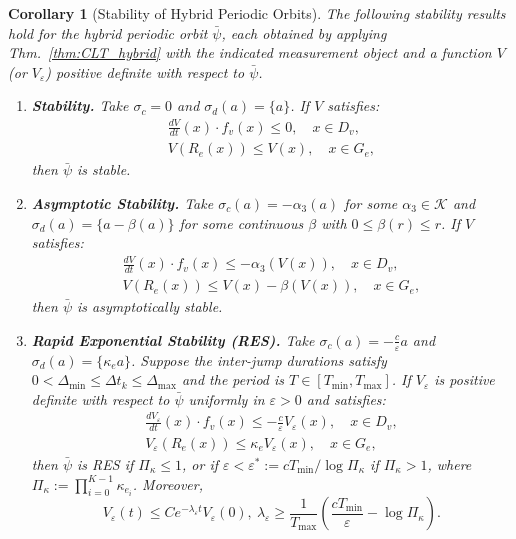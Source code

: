 \documentclass[letterpaper, 10 pt, conference]{IEEEconf}
\newtheorem{cor}[thm]{Corollary}
\theoremstyle{definition}
\begin{document}
\begin{cor}[Stability of Hybrid Periodic Orbits]
\label{cor:orbitstability}
    The following stability results hold for the hybrid periodic orbit $\bar\psi$, each obtained by applying Thm.~\ref{thm:CLT_hybrid} with the indicated measurement object and a function $V$ (or $V_\varepsilon$) positive definite with respect to $\bar\psi$.
    \begin{enumerate}
        \item \textbf{Stability.} Take $\sigma_c = 0$ and $\sigma_d(a) = \{a\}$. If $V$ satisfies:
        \begin{align}
            \frac{dV}{dt}(x) \cdot f_v(x) \leq 0, \quad x \in D_v, \label{eq:stab_flow} \\
            V(R_e(x)) \leq V(x), \quad x \in G_e, \label{eq:stab_jump}
        \end{align}
        then $\bar\psi$ is stable.
        \item \textbf{Asymptotic Stability.} Take $\sigma_c(a) = -\alpha_3(a)$ for some $\alpha_3 \in \mathcal{K}$ and $\sigma_d(a) = \{a-\beta(a)\}$ for some continuous $\beta$ with $0 \leq \beta(r) \leq r$. If $V$ satisfies:
        \begin{align}
            \frac{dV}{dt}(x) \cdot f_v(x) \leq -\alpha_3(V(x)), \quad x \in D_v, \label{eq:asym_flow} \\
            V(R_e(x)) \leq V(x) - \beta(V(x)), \quad x \in G_e, \label{eq:asym_jump}
        \end{align}
        then $\bar\psi$ is asymptotically stable.
        \item \textbf{Rapid Exponential Stability (RES).} Take $\sigma_c(a) = -\frac{c}{\varepsilon}a$ and $\sigma_d(a) = \{\kappa_e a\}$. Suppose the inter-jump durations satisfy $0 < \Delta_{\min} \leq \Delta t_k \leq \Delta_{\max}$ and the period is $T \in [T_{\min}, T_{\max}]$. If $V_\varepsilon$ is positive definite with respect to $\bar\psi$ uniformly in $\varepsilon > 0$ and satisfies:
        \begin{align}
            \frac{dV_\varepsilon}{dt}(x) \cdot f_v(x) \leq -\frac{c}{\varepsilon} V_\varepsilon(x), \quad x \in D_v, \label{eq:RES_flow} \\
            V_\varepsilon(R_e(x)) \leq \kappa_e V_\varepsilon(x), \quad x \in G_e, \label{eq:RES_jump}
        \end{align}
        then $\bar\psi$ is RES if $\Pi_\kappa \leq 1$, or if $\varepsilon < \varepsilon^* := cT_{\min}/\log\Pi_\kappa$ if $\Pi_\kappa > 1$, where $\Pi_\kappa := \prod_{i=0}^{K-1}\kappa_{e_i}$. Moreover,
        \begin{equation*}
            V_\varepsilon(t) \leq Ce^{-\lambda_\varepsilon t} V_\varepsilon(0), \ \lambda_\varepsilon \geq \frac{1}{T_{\max}}\left(\frac{cT_{\min}}{\varepsilon} - \log\Pi_\kappa\right).
        \end{equation*}
    \end{enumerate}
\end{cor}
\end{document}
